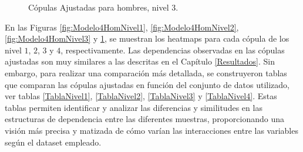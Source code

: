 \begin{figure}[H]
 \centering
    \caption{Cópulas Ajustadas para hombres, nivel $3$.}
    \label{fig:Modelo4HomNivel4}
\end{figure}

En las Figuras \ref{fig:Modelo4HomNivel1}, \ref{fig:Modelo4HomNivel2}, \ref{fig:Modelo4HomNivel3} y \ref{fig:Modelo4HomNivel4}, se muestran los heatmaps para cada cópula de los nivel $1$, $2$, $3$ y $4$, respectivamente. Las dependencias observadas en las cópulas ajustadas son muy similares a las descritas en el Capítulo \ref{Resultados}. Sin embargo, para realizar una comparación más detallada, se construyeron tablas que comparan las cópulas ajustadas en función del conjunto de datos utilizado, ver tablas \ref{TablaNivel1}, \ref{TablaNivel2}, \ref{TablaNivel3} y \ref{TablaNivel4}. Estas tablas permiten identificar y analizar las diferencias y similitudes en las estructuras de dependencia entre las diferentes muestras, proporcionando una visión más precisa y matizada de cómo varían las interacciones entre las variables según el dataset empleado.

